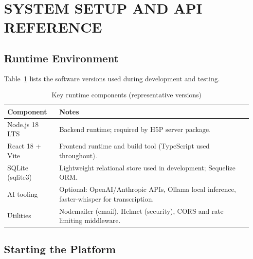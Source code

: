\section{SYSTEM SETUP AND API REFERENCE}

\subsection{Runtime Environment}

Table~\ref{tab:runtime} lists the software versions used during development
and testing.

\begin{table}[H]
  \centering
  \caption{Key runtime components (representative versions)}
  \label{tab:runtime}
  \begin{tabularx}{\linewidth}{lX}
    \toprule
    \textbf{Component} & \textbf{Notes} \\
    \midrule
    Node.js 18 LTS & Backend runtime; required by H5P server package. \\
    React 18 + Vite & Frontend runtime and build tool (TypeScript used throughout). \\
    SQLite (sqlite3) & Lightweight relational store used in development; Sequelize ORM. \\
    AI tooling & Optional: OpenAI/Anthropic APIs, Ollama local inference, faster-whisper for transcription. \\
    Utilities & Nodemailer (email), Helmet (security), CORS and rate-limiting middleware. \\
    \bottomrule
  \end{tabularx}
\end{table}

\subsection{Starting the Platform}


